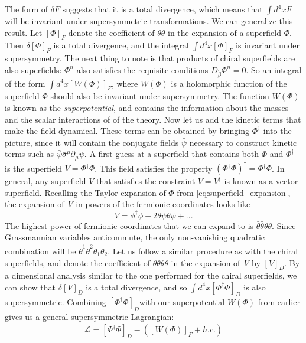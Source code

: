 The form of $\delta F$ suggests that it is a total divergence, which means that $\int d^4x F$ will be invariant under supersymmetric transformations. We can generalize this result. Let $[\Phi]_F$ denote the coefficient of $\theta\theta$ in the expansion of a superfield $\Phi$. Then $\delta[\Phi]_F$ is a total divergence, and the integral $\int d^4x [\Phi]_F$ is invariant under supersymmetry. The next thing to note is that products of chiral superfields are also superfields: $\Phi^n$ also satisfies the requisite conditions $\bar{D}_{\dot{\beta}}\Phi^n = 0$. So an integral of the form $\int d^4x[W(\Phi)]_F$, where $W(\Phi)$ is a holomorphic  function of the superfield $\Phi$ should also be invariant under supersymmetry. The function $W(\Phi)$ is known as the \emph{superpotential}, and contains the information about the masses and the scalar interactions of of the theory. Now let us add the kinetic terms that make the field dynamical. These terms can be obtained by bringing $\Phi^\dagger$ into the picture, since it will contain the conjugate fields $\bar{\psi}$ necessary to construct kinetic terms such as $\bar{\psi}\bar{\sigma}^\mu\partial_\mu\psi$. A first guess at a superfield that contains both $\Phi$ and $\Phi^\dagger$ is the superfield $V = \Phi^\dagger\Phi$. This field satisfies the property $(\Phi^\dagger\Phi)^\dagger = \Phi^\dagger\Phi$. In general, any superfield $V$ that satisfies the constraint $V = V^\dagger$ is known as a vector superfield.
Recalling the Taylor expansion of $\Phi$ from \eqref{eq:superfield_expansion}, the expansion of \emph{V} in powers of the fermionic coordinates looks like
\[V = \phi^\dagger\phi + 2\bar{\theta}\bar{\psi}\theta\psi + ...\]
The highest power of fermionic coordinates that we can expand to is $\bar{\theta}\bar{\theta}\theta\theta$. Since Grassmannian variables anticommute, the only non-vanishing quadratic combination will be $\bar{\theta}^{\dot{1}}\bar{\theta}^{\dot{2}}\theta_1\theta_2$. Let us follow a similar procedure as with the chiral superfields, and denote the coefficient of $\bar{\theta}\bar{\theta}\theta\theta$ in the expansion of \emph{V} by $[V]_D$. By a dimensional analysis similar to the one performed for the chiral superfields, we can show that $\delta[V]_D$ is a total divergence, and so $\int d^4x[\Phi^\dagger\Phi]_D$ is also supersymmetric. Combining $[\Phi^\dagger\Phi]_D$with our superpotential $W(\Phi)$ from earlier gives us a general supersymmetric Lagrangian:
\begin{align*}
  \mathcal{L} = [\Phi^\dagger\Phi]_D - \left([W(\Phi)]_F + h.c.\right)
\end{align*}
